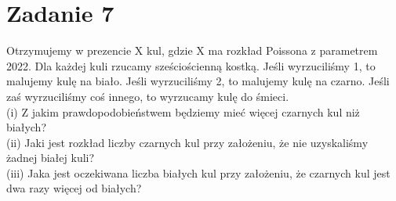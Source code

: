 \section{Zadanie 7}
Otrzymujemy w prezencie X kul, gdzie X ma rozkład Poissona z parametrem 2022. Dla każdej kuli rzucamy sześciościenną kostką. Jeśli wyrzuciliśmy 1, to malujemy
kulę na biało. Jeśli wyrzuciliśmy 2, to malujemy kulę na czarno. Jeśli zaś wyrzuciliśmy
coś innego, to wyrzucamy kulę do śmieci.\\
(i) Z jakim prawdopodobieństwem będziemy mieć więcej czarnych kul niż białych?\\
(ii) Jaki jest rozkład liczby czarnych kul przy założeniu, że nie uzyskaliśmy żadnej białej kuli?\\
(iii) Jaka jest oczekiwana liczba białych kul przy założeniu, że czarnych kul jest dwa razy więcej od białych?

